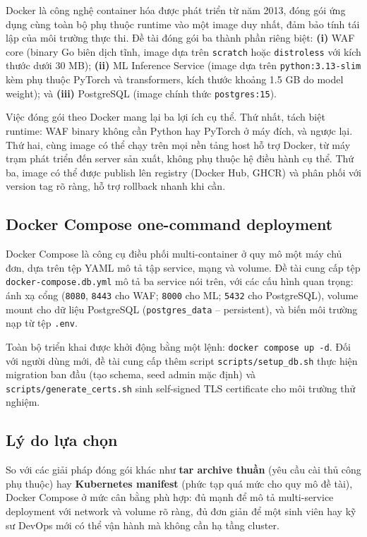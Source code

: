 \documentclass[../DoAn.tex]{subfiles}
\begin{document}
Docker là công nghệ container hóa được phát triển từ năm 2013, đóng gói
ứng dụng cùng toàn bộ phụ thuộc runtime vào một image duy nhất, đảm bảo
tính tái lập của môi trường thực thi. Đề tài đóng gói ba thành phần riêng
biệt: \textbf{(i)} WAF core (binary Go biên dịch tĩnh, image dựa trên
\texttt{scratch} hoặc \texttt{distroless} với kích thước dưới 30 MB);
\textbf{(ii)} ML Inference Service (image dựa trên \texttt{python:3.13-slim}
kèm phụ thuộc PyTorch và transformers, kích thước khoảng 1.5 GB do model
weight); và \textbf{(iii)} PostgreSQL (image chính thức \texttt{postgres:15}).

Việc đóng gói theo Docker mang lại ba lợi ích cụ thể. Thứ nhất, tách biệt
runtime: WAF binary không cần Python hay PyTorch ở máy đích, và ngược lại.
Thứ hai, cùng image có thể chạy trên mọi nền tảng host hỗ trợ Docker, từ
máy trạm phát triển đến server sản xuất, không phụ thuộc hệ điều hành cụ
thể. Thứ ba, image có thể được publish lên registry (Docker Hub, GHCR) và
phân phối với version tag rõ ràng, hỗ trợ rollback nhanh khi cần.

\subsection{Docker Compose one-command deployment}
\label{subsection:3.8.2}

Docker Compose là công cụ điều phối multi-container ở quy mô một máy
chủ đơn, dựa trên tệp YAML mô tả tập service, mạng và volume. Đề tài cung
cấp tệp \texttt{docker-compose.db.yml} mô tả ba service nói trên, với các
cấu hình quan trọng: ánh xạ cổng (\texttt{8080}, \texttt{8443} cho WAF;
\texttt{8000} cho ML; \texttt{5432} cho PostgreSQL), volume mount cho dữ
liệu PostgreSQL (\texttt{postgres\_data} -- persistent), và biến môi trường
nạp từ tệp \texttt{.env}.

Toàn bộ triển khai được khởi động bằng một lệnh: \texttt{docker compose up
-d}. Đối với người dùng mới, đề tài cung cấp thêm script
\texttt{scripts/setup\_db.sh} thực hiện migration ban đầu (tạo schema, seed
admin mặc định) và \texttt{scripts/generate\_certs.sh} sinh self-signed TLS
certificate cho môi trường thử nghiệm.

\subsection{Lý do lựa chọn}
\label{subsection:3.8.3}

So với các giải pháp đóng gói khác như \textbf{tar archive thuần} (yêu cầu
cài thủ công phụ thuộc) hay \textbf{Kubernetes manifest} (phức tạp quá mức
cho quy mô đề tài), Docker Compose ở mức cân bằng phù hợp: đủ mạnh để mô tả
multi-service deployment với network và volume rõ ràng, đủ đơn giản để một
sinh viên hay kỹ sư DevOps mới có thể vận hành mà không cần hạ tầng cluster.
\end{document}
